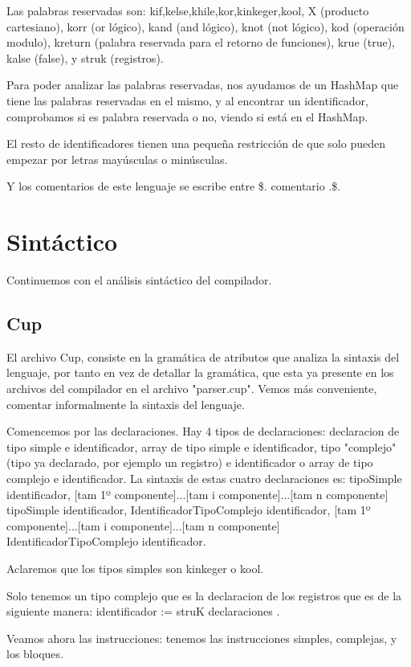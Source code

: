\documentclass[a4paper, 11pt, twoside, openany, onecolumn, final]{memoir}
\begin{document}
	Las palabras reservadas son: kif,kelse,khile,kor,kinkeger,kool, X (producto cartesiano), korr (or lógico), kand (and lógico), knot (not lógico), kod (operación modulo), kreturn (palabra reservada para el retorno de funciones), krue (true), kalse (false), y struk (registros).
	
	Para poder analizar las palabras reservadas, nos ayudamos de un HashMap que tiene las palabras reservadas en el mismo, y al encontrar un identificador, comprobamos si es palabra reservada o no, viendo si está en el HashMap.
	
	El resto de identificadores tienen una pequeña restricción de que solo pueden empezar por letras mayúsculas o minúsculas.
	
	Y los comentarios de este lenguaje se escribe entre \$. comentario .\$.
	
	\section{Sintáctico}
	Continuemos con el análisis sintáctico del compilador.
	\subsection{Cup}
	El archivo Cup, consiste en la gramática de atributos que analiza la sintaxis del lenguaje, por tanto en vez de detallar la gramática, que esta ya presente en los archivos del compilador en el archivo "parser.cup". Vemos más conveniente, comentar informalmente la sintaxis del lenguaje.
	
	Comencemos por las declaraciones. Hay 4 tipos de declaraciones: declaracion de tipo simple e identificador, array de tipo simple e identificador, tipo "complejo" (tipo ya declarado, por ejemplo un registro) e identificador o array de tipo complejo e identificador.
	La sintaxis de estas cuatro declaraciones es:
	tipoSimple identificador, [tam 1º componente]...[tam i componente]...[tam n componente] tipoSimple identificador, IdentificadorTipoComplejo identificador, [tam 1º componente]...[tam i componente]...[tam n componente] IdentificadorTipoComplejo identificador. 

	Aclaremos que los tipos simples son kinkeger o kool.	
	
	Solo tenemos un tipo complejo que es la declaracion de los registros que es de la siguiente manera: identificador := struK { declaraciones }.
	
	Veamos ahora las instrucciones: tenemos las instrucciones simples, complejas, y los bloques.
	
\end{document}

